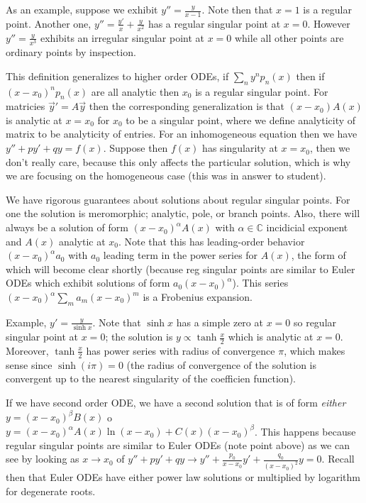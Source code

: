 \documentclass[10pt]{report}
\begin{document}
As an example, suppose we exhibit $y'' = \frac{y}{x-1}$. Note then that $x=1$ is a regular point. Another one, $y'' = \frac{y'}{x} + \frac{y}{x^2}$ has a regular singular point at $x=0$. However $y'' = \frac{y}{x^3}$ exhibits an irregular singular point at $x=0$ while all other points are ordinary points  by inspection. 

This definition generalizes to higher order ODEs, if $\sum_n y^np_n(x)$ then if $(x-x_0)^np_n(x)$ are all analytic then $x_0$ is a regular singular point. For matricies $\vec{y}' = A\vec{y}$ then the corresponding generalization is that $(x-x_0)A(x)$ is analytic at $x=x_0$ for $x_0$ to be a singular point, where we define analyticity of matrix to be analyticity of entries. For an inhomogeneous equation then we have $y'' + py' + qy = f(x)$. Suppose then $f(x)$ has singularity at $x=x_0$, then we don't really care, because this only affects the particular solution, which is why we are focusing on the homogeneous case (this was in answer to student).  

We have rigorous guarantees about solutions about regular singular points. For one the solution is meromorphic; analytic, pole, or branch points. Also, there will always be a solution of form $(x-x_0)^\alpha A(x)$ with $\alpha\in \mathbb{C}$ incidicial exponent and $A(x)$ analytic at $x_0$. Note that this has leading-order behavior $(x-x_0)^\alpha a_0$ with $a_0$ leading term in the power series for $A(x)$, the form of which will become clear shortly (because reg singular points are similar to Euler ODEs which exhibit solutions of form $a_0(x-x_0)^\alpha$). This series $(x-x_0)^\alpha \sum_{m}^{}a_m(x-x_0)^m$ is a Frobenius expansion. 

Example, $y' = \frac{y}{\sinh x}$. Note that $\sinh x$ has a simple zero at $x=0$ so regular singular point at $x=0$; the solution is $y \propto \tanh \frac{x}{2}$ which is analytic at $x=0$. Moreover, $\tanh\frac{x}{2}$ has power series with radius of convergence $\pi$, which makes sense since $\sinh(i\pi) = 0$ (the radius of convergence of the solution is convergent up to the nearest singularity of the coefficien function). 

If we have second order ODE, we have a second solution that is of form \emph{either} $y = (x-x_0)^\beta B(x)$ o $y = (x-x_0)^\alpha A(x)\ln(x-x_0) + C(x)(x-x_0)^\beta$. This happens because regular singular points are similar to Euler ODEs (note point above) as we can see by looking as $x\to x_0$ of $y'' + py' + qy \to y'' + \frac{p_0}{x-x_0}y' + \frac{q_0}{(x-x_0)^2}y = 0$. Recall then that Euler ODEs have either power law solutions or multiplied by logarithm for degenerate roots. 
\end{document}
